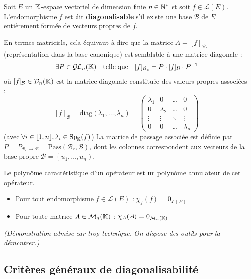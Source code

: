 \documentclass[12pt, a4paper]{report}
\begin{document}
\begin{definition}[Diagonalisabilité]
    Soit $E$ un $\mathbb{K}$-espace vectoriel de dimension finie $n \in \mathbb{N}^*$ et soit $f \in \mathcal{L}(E)$.
    L'endomorphisme $f$ est dit \textbf{diagonalisable} s'il existe une base $\mathcal{B}$ de $E$ entièrement formée de vecteurs propres de $f$.
    
    En termes matriciels, cela équivaut à dire que la matrice $A = [f]_{\mathcal{B}_c}$ (représentation dans la base canonique) est semblable à une matrice diagonale :
    $$\exists P \in \mathcal{GL}_n(\mathbb{K}) \quad \text{telle que} \quad [f]_{\mathcal{B}_c} = P \cdot [f]_{\mathcal{B}} \cdot P^{-1}$$
    où $[f]_{\mathcal{B}} \in \mathcal{D}_n(\mathbb{K})$ est la matrice diagonale constituée des valeurs propres associées :
    $$[f]_{\mathcal{B}} = \text{diag}(\lambda_1, \dots, \lambda_n) = \begin{pmatrix} \lambda_1 & 0 & \dots & 0 \\ 0 & \lambda_2 & \dots & 0 \\ \vdots & \vdots & \ddots & \vdots \\ 0 & 0 & \dots & \lambda_n \end{pmatrix}$$
    (avec $\forall i \in [\![1,n]\!], \lambda_i \in \mathrm{Sp}_{\mathbb{K}}(f)$)
    La matrice de passage associée est définie par $P = P_{\mathcal{B}_c \to \mathcal{B}} = \text{Pass}(\mathcal{B}_c, \mathcal{B})$, dont les colonnes correspondent aux vecteurs de la base propre $\mathcal{B} = (u_1, \dots, u_n)$.
\end{definition}

\begin{theorem}
    Le polynôme caractéristique d'un opérateur est un polynôme annulateur de cet opérateur.
    \begin{itemize}
        \item Pour tout endomorphisme $f \in \mathcal{L}(E)$ : $\chi_f(f) = 0_{\mathcal{L}(E)}$
        \item Pour toute matrice $A \in \mathcal{M}_n(\mathbb{K})$ : $\chi_A(A) = 0_{\mathcal{M}_n(\mathbb{K})}$
    \end{itemize}
    \textit{(Démonstration admise car trop technique. On dispose des outils pour la démontrer.)}
\end{theorem}

\subsection{Critères généraux de diagonalisabilité}
\end{document}
